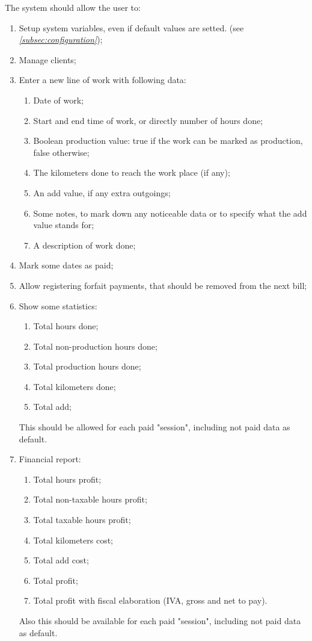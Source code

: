 \documentclass[11pt]{article}
\begin{document}
The system should allow the user to:
\begin{enumerate}[label=(\alph*)]
\item Setup system variables, even if default values are setted. (see \textit{\ref{subsec:configuration}});
\item Manage clients;
\item Enter a new line of work with following data: 
\begin{enumerate}[label=\arabic*)]
\item Date of work;
\item Start and end time of work, or directly number of hours done;
\item Boolean production value: true if the work can be marked as production, false otherwise;
\item The kilometers done to reach the work place (if any);
\item An add value, if any extra outgoings;
\item Some notes, to mark down any noticeable data or to specify what the add value stands for;
\item A description of work done;
\end{enumerate}
\item Mark some dates as paid;
\item Allow registering forfait payments, that should be removed from the next bill;
\item Show some statistics:
\begin{enumerate}[label=\arabic*)]
\item Total hours done;
\item Total non-production hours done;
\item Total production hours done;
\item Total kilometers done;
\item Total add;
\end{enumerate}
This should be allowed for each paid "session", including not paid data as default.
\item Financial report:
\begin{enumerate}[label=\arabic*)]
\item Total hours profit;
\item Total non-taxable hours profit;
\item Total taxable hours profit;
\item Total kilometers cost;
\item Total add cost;
\item Total profit;
\item Total profit with fiscal elaboration (IVA, gross and net to pay). 
\end{enumerate}
Also this should be available for each paid "session", including not paid data as default.
\end{enumerate}
\end{document}

